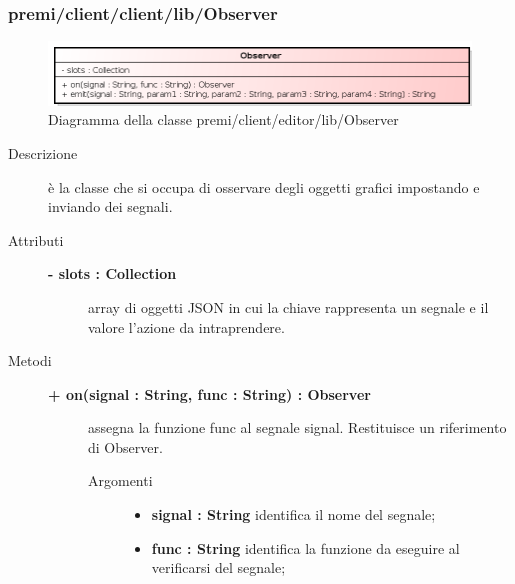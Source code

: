\subsubsection{premi/client/client/lib/Observer}
\begin{figure}[H]
\begin{center}
\includegraphics[scale=0.70]{img/diacla/Observer.png}
\caption{Diagramma della classe premi/client/editor/lib/Observer}
\end{center}
\end{figure}

\begin{description}
\item[Descrizione] \hfill
	è la classe che si occupa di osservare degli oggetti grafici impostando e inviando dei segnali.
		
	
\item[Attributi] \hfill
	\begin{description}
		\item[\textbf{- slots : Collection			}] \hfill
			array di oggetti JSON in cui la chiave rappresenta un segnale e il valore l'azione da intraprendere.
	\end{description}
	
	
\item[Metodi] \hfill

	\begin{description}
		\item[\textbf{\color{blue}+ on(signal : String, func : String) : Observer			}] \hfill
			assegna la funzione func al segnale signal. Restituisce un riferimento di Observer.
			
		\begin{description}
			\item[Argomenti] \hfill
				\begin{itemize}
				
					\item \textbf{signal : String			} \hfill
					identifica il nome del segnale;
					\item \textbf{func : String			} \hfill
					identifica la funzione da eseguire al verificarsi del segnale;			
				\end{itemize}
		\end{description}
	\end{description}		
	

\end{description}

